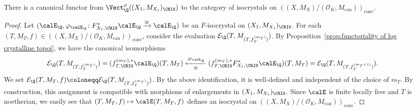 \begin{prop}\label{prop: F-isocrystals to convergent isocrystals}
There is a canonical functor from $\Vect_\Q^\varphi((X_1,M_{X_1})_\CRIS)$ to the category of isocrystals on $((X, M_X) / (\mathcal{O}_K, M_\mathrm{can}))_{\mathrm{conv}}$.    
\end{prop}

\begin{proof}
Let $(\calE_\Q,\varphi_{\calE_\Q}\colon F^\ast_{X_1,\CRIS}\calE_\Q\xrightarrow{\cong}\calE_\Q)$ be an $F$-isocrystal on $(X_1,M_{X_1})_\CRIS$. For each $(T, M_T, f) \in ((X, M_X) / (\mathcal{O}_K, M_\mathrm{can}))_{\mathrm{conv}}$, consider the evaluation $\mathcal{E}_\Q(T, M_{(T, f_T^{(m_T)})})$. By Proposition~\ref{prop:functoriality of log crystalline topoi}, we have the canonical isomorphisms
\[
\mathcal{E}_\Q(T, M_{(T, f_T^{(m_T)})})=(f_{T,\CRIS}^{(m_T),\ast}\calE_\Q)(T,M_T)\underset{\cong}{\xleftarrow{\varphi_{\calE_\Q}}}(f_{T,\CRIS}^{(m_T),\ast}F^\ast_{X_1,\CRIS}\calE_\Q)(T,M_T)=\mathcal{E}_\Q(T, M_{(T, f_T^{(m_T+1)})}).
\]
We set $\mathcal{E}_\Q(T, M_T, f) \coloneqq \mathcal{E}_\Q(T, M_{(T, f_T^{(m_T)})})$. By the above identification, it is well-defined and independent of the choice of $m_T$. By construction, this assignment is compatible with morphisms of enlargements in $(X_1,M_{X_1})_\CRIS$. Since $\calE$ is finite locally free and $T$ is noetherian, we easily see that $(T,M_T,f)\mapsto \calE(T, M_T,f)$ defines an isocrystal on $((X, M_X) / (\mathcal{O}_K, M_\mathrm{can}))_{\mathrm{conv}}$.
\end{proof}


